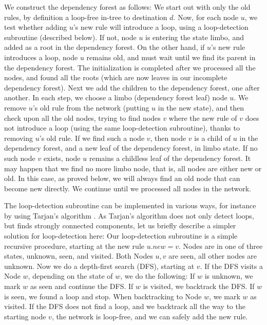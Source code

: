 We construct the dependency forest as follows: We start out with only the old rules, by definition a loop-free in-tree to destination $d$. Now, for each node $u$, we test whether adding $u$'s new rule will introduce a loop, using a loop-detection subroutine (described below). If not, node $u$ is entering the state limbo, and added as a root in the dependency forest. On the other hand, if $u$'s new rule introduces a loop, node $u$ remains old, and must wait until we find its parent in the dependency forest. The initialization is completed after we processed all the nodes, and found all the roots (which are now leaves in our incomplete dependency forest). Next we add the children to the dependency forest, one after another. In each step, we choose a limbo (dependency forest leaf) node $u$. We remove $u$'s old rule from the network (putting $u$ in the new state), and then check upon all the old nodes, trying to find nodes $v$ where the new rule of $v$ does not introduce a loop (using the same loop-detection subroutine), thanks to removing $u$'s old rule. If we find such a node $v$, then node $v$ is a child of $u$ in the dependency forest, and a new leaf of the dependency forest, in limbo state. If no such node $v$ exists, node $u$ remains a childless leaf of the dependency forest. It may happen that we find no more limbo node, that is, all nodes are either new or old. In this case, as proved below, we will always find an old node that can become new directly.
We continue until we processed all nodes in the network.

The loop-detection subroutine can be implemented in various ways, for instance by using
Tarjan's algorithm \cite{reference_1_in_http://en.wikipedia.org/wiki/Tarjan's_strongly_connected_components_algorithm}. As Tarjan's algorithm does not only detect loops, but finds strongly connected components, let us briefly describe a simpler solution for loop-detection here: Our loop-detection subroutine is a simple recursive procedure, starting at the new rule $u.new = v$. Nodes are in one of three states, unknown, seen, and visited. Both Nodes $u,v$ are seen, all other nodes are unknown. Now we do a depth-first search (DFS), starting at $v$. If the DFS visits a Node $w$, depending on the state of $w$, we do the following: If $w$ is unknown, we mark $w$ as seen and continue the DFS. If $w$ is visited, we backtrack the DFS. If $w$ is seen, we found a loop and stop. When backtracking to Node $w$, we mark $w$ as visited. If the DFS does not find a loop, and we backtrack all the way to the starting node $v$, the network is loop-free, and we can safely add the new rule.


